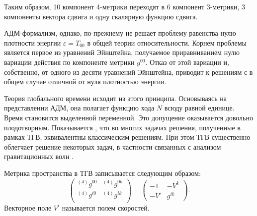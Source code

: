 \documentclass[\docroot/reports/draft/report.tex]{subfiles}
\begin{document}
    Таким образом, 10 компонент 4-метрики переходят в 6 компонент 3-метрики, 3 компоненты вектора сдвига и одну скалярную функцию сдвига.

    АДМ-формализм, однако, по-прежнему не решает проблему равенства нулю плотности энергии $\varepsilon = T_{00}$ в общей теории относительности. Корнем проблемы является первое из уравнений Эйнштейна, получаемое приравниванием нулю вариации действия по компоненте метрики $g^{00}$. Отказ от этой вариации и, собственно, от одного из десяти уравнений Эйнштейна, приводит к решениям с в общем случае отличной от нуля плотностью энергии.

    Теория глобального времени исходит из этого принципа. Основываясь на представлении АДМ, она полагает функцию хода $N$ всюду равной единице. Время становится выделенной переменной. Это допущение оказывается довольно плодотворным. Показывается \cite{burlankov_space_dynamics,burlankov_grav_waves}, что во многих задачах решения, полученные в рамках ТГВ, эквивалентны классическим решениям. При этом ТГВ существенно облегчает решение некоторых задач, в частности связанных с анализом гравитационных волн \cite{burlankov_grav_waves}.

    Метрика пространства в ТГВ записывается следующим образом:
    \begin{equation*}
        \begin{pmatrix}
            {}^{(4)}g^{00} & {}^{(4)}g^{0k} \\
            {}^{(4)}g^{i0} & {}^{(4)}g^{ik} \\
        \end{pmatrix} =
        \begin{pmatrix}
            - 1   & - V^k \\
            - V^i & g^{ik}
        \end{pmatrix} .
    \end{equation*}
    Векторное поле $V^i$ называется полем скоростей.

\end{document}
